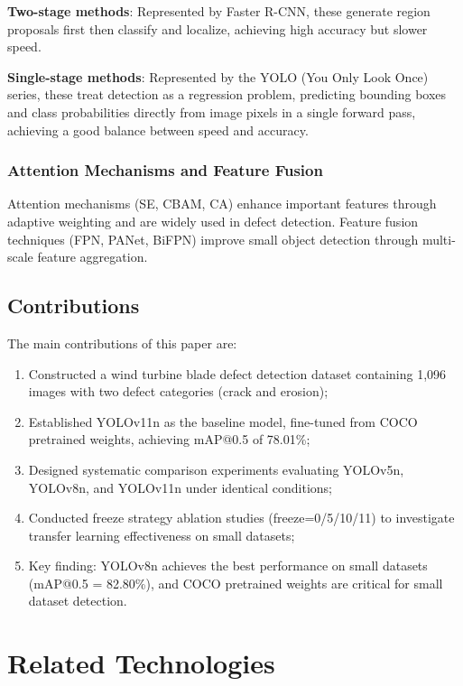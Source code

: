 \documentclass[12pt,a4paper]{article}
\begin{document}
\textbf{Two-stage methods}: Represented by Faster R-CNN, these generate region proposals first then classify and localize, achieving high accuracy but slower speed.

\textbf{Single-stage methods}: Represented by the YOLO (You Only Look Once) series, these treat detection as a regression problem, predicting bounding boxes and class probabilities directly from image pixels in a single forward pass, achieving a good balance between speed and accuracy.

\subsubsection{Attention Mechanisms and Feature Fusion}
Attention mechanisms (SE, CBAM, CA) enhance important features through adaptive weighting and are widely used in defect detection. Feature fusion techniques (FPN, PANet, BiFPN) improve small object detection through multi-scale feature aggregation.

\subsection{Contributions}

The main contributions of this paper are:
\begin{enumerate}[noitemsep]
  \item Constructed a wind turbine blade defect detection dataset containing 1,096 images with two defect categories (crack and erosion);
  \item Established YOLOv11n as the baseline model, fine-tuned from COCO pretrained weights, achieving mAP@0.5 of 78.01\%;
  \item Designed systematic comparison experiments evaluating YOLOv5n, YOLOv8n, and YOLOv11n under identical conditions;
  \item Conducted freeze strategy ablation studies (freeze=0/5/10/11) to investigate transfer learning effectiveness on small datasets;
  \item Key finding: YOLOv8n achieves the best performance on small datasets (mAP@0.5 = 82.80\%), and COCO pretrained weights are critical for small dataset detection.
\end{enumerate}

\section{Related Technologies}
\end{document}
